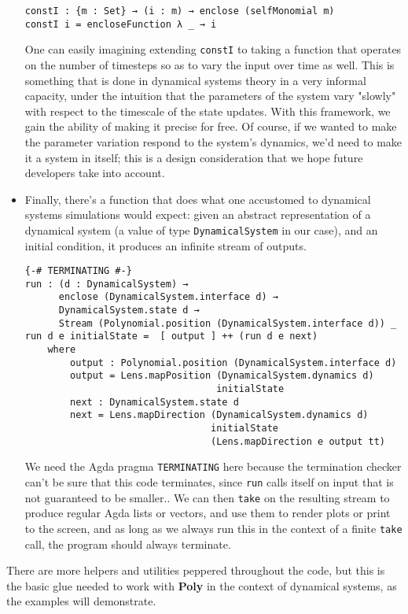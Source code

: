 \begin{itemize}
\begin{verbatim}
constI : {m : Set} → (i : m) → enclose (selfMonomial m)
constI i = encloseFunction λ _ → i
\end{verbatim}
    One can easily imagining extending \texttt{constI} to taking a function that operates on the number of timesteps so as to vary the input over time as well. This is something that is done in dynamical systems theory in a very informal capacity, under the intuition that the parameters of the system vary "slowly" with respect to the timescale of the state updates. With this framework, we gain the ability of making it precise for free. Of course, if we wanted to make the parameter variation respond to the system's dynamics, we'd need to make it a system in itself; this is a design consideration that we hope future developers take into account.
    \item Finally, there's a function that does what one accustomed to dynamical systems simulations would expect: given an abstract representation of a dynamical system (a value of type \texttt{DynamicalSystem} in our case), and an initial condition, it produces an infinite stream of outputs.
\begin{verbatim}
{-# TERMINATING #-}
run : (d : DynamicalSystem) → 
      enclose (DynamicalSystem.interface d) → 
      DynamicalSystem.state d → 
      Stream (Polynomial.position (DynamicalSystem.interface d)) _
run d e initialState =  [ output ] ++ (run d e next)
    where
        output : Polynomial.position (DynamicalSystem.interface d)
        output = Lens.mapPosition (DynamicalSystem.dynamics d) 
                                  initialState
        next : DynamicalSystem.state d
        next = Lens.mapDirection (DynamicalSystem.dynamics d) 
                                 initialState
                                 (Lens.mapDirection e output tt)
\end{verbatim}
    We need the Agda pragma \texttt{TERMINATING} here because the termination checker can't be sure that this code terminates, since \texttt{run} calls itself on input that is not guaranteed to be smaller.. We can then \texttt{take} on the resulting stream to produce regular Agda lists or vectors, and use them to render plots or print to the screen, and as long as we always run this in the context of a finite \texttt{take} call, the program should always terminate.
\end{itemize}
There are more helpers and utilities peppered throughout the code, but this is the basic glue needed to work with \textbf{Poly} in the context of dynamical systems, as the examples will demonstrate.


